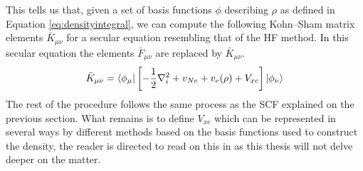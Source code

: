 \documentclass[../master_thesis.tex]{subfiles}
\begin{document}
This tells us that, given a set of basis functions $\phi$ describing
$\rho$ as defined in Equation \ref{eq:densityintegral}, we can compute the following
Kohn--Sham  matrix elements $\bar{K}_{\mu\nu}$ for a secular equation resembling that of the \ac{HF}
method. In this secular equation the elements $\bar{F}_{\mu\nu}$ are replaced by $\bar{K}_{\mu\nu}$.
\begin{equation}
  \bar{K}_{\mu\nu} = \braket{\phi_\mu|\left[- \frac{1}{2}\nabla^2_i + v_{Ne} + v_e(\rho) + V_{xc}\right]|\phi_\nu}
\end{equation}
The rest of the procedure follows the same process as the \ac{SCF} explained on
the previous section.
What remains is to define $V_{xc}$ which can be represented in several ways by different methods
based on the basis functions used to construct the density, the reader is directed to
read on this in \cite{Cramer:2004} as this thesis will not delve deeper on the
matter.


\biblio
\end{document}
